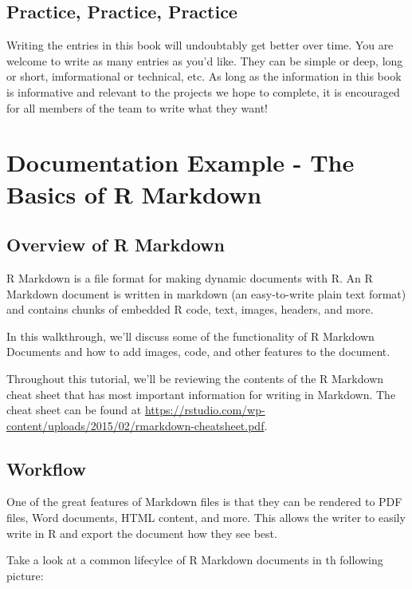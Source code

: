 \documentclass[]{book}
\begin{document}
\section{Practice, Practice, Practice}\label{practice-practice-practice}

Writing the entries in this book will undoubtably get better over time.
You are welcome to write as many entries as you'd like. They can be
simple or deep, long or short, imformational or technical, etc. As long
as the information in this book is informative and relevant to the
projects we hope to complete, it is encouraged for all members of the
team to write what they want!

\chapter{Documentation Example - The Basics of R
Markdown}\label{documentation-example---the-basics-of-r-markdown}

\section{Overview of R Markdown}\label{overview-of-r-markdown}

R Markdown is a file format for making dynamic documents with R. An R
Markdown document is written in markdown (an easy-to-write plain text
format) and contains chunks of embedded R code, text, images, headers,
and more.

In this walkthrough, we'll discuss some of the functionality of R
Markdown Documents and how to add images, code, and other features to
the document.

Throughout this tutorial, we'll be reviewing the contents of the R
Markdown cheat sheet that has most important information for writing in
Markdown. The cheat sheet can be found at
\url{https://rstudio.com/wp-content/uploads/2015/02/rmarkdown-cheatsheet.pdf}.

\section{Workflow}\label{workflow}

One of the great features of Markdown files is that they can be rendered
to PDF files, Word documents, HTML content, and more. This allows the
writer to easily write in R and export the document how they see best.

Take a look at a common lifecylce of R Markdown documents in th
following picture:
\end{document}
